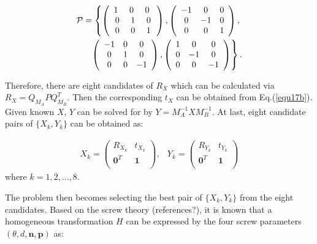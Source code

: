 \documentclass[letterpaper, 10 pt, conference]{ieeeconf}  %
\begin{document}
\begin{equation}\label{equ19}
\begin{split}
{\cal P} = \left\{ \left(\begin{array}{ccc}
1\,\, & 0 \,\, & 0 \,\, \\
0 & 1 & 0\\
0 & 0 & 1 \end{array}\right) , \left(\begin{array}{ccc}
-1 & 0 & 0 \\
0 & -1 & 0\\
0 & 0 & 1 \end{array}\right), \right.\\
\left. \left(\begin{array}{ccc}
-1 & 0 & 0 \\
0 & 1 & 0\\
0 & 0 & -1 \end{array}\right), \left(\begin{array}{ccc}
1 & 0 & 0 \\
0 & -1 & 0\\
0 & 0 & -1 \end{array}\right)\right\}.
\end{split} 
\end{equation}

Therefore, there are eight candidates of $R_{X}$ which can be calculated via $R_{X}=Q_{M_{A}}PQ_{M_{B}}^T$. Then the corresponding $t_{X}$ can be obtained  from Eq.(\ref{equ17b}). Given known $X$, $Y$ can be solved for by $Y = M_A^{-1}XM_B^{-1}$. At last, eight candidate pairs of  $\{X_{k},Y_{k}\}$ can be obtained as: 

\begin{equation}\label{equ20}
\begin{array}{cc}
X_{k}= \left( \begin{array}{cc}
       R_{X_k} & t_{X_k} \\
       \mathbf{0}^{T} & \mathbf{1}\\
\end{array} \right),&
Y_{k}= \left( \begin{array}{cc}
       R_{Y_k} & t_{Y_k} \\
       \mathbf{0}^{T} & \mathbf{1}\\
\end{array} \right)
\end{array}
\end{equation}
where $k = 1,2,...,8$.

The problem then becomes selecting the best pair of $\{X_k, Y_k\}$ from the eight candidates. 
Based on the screw theory (references?), it is known that a homogeneous transformation $H$ can be expressed by the four screw parameters $(\theta,d,\mathbf{n},\mathbf{p})$ as:
\end{document}
